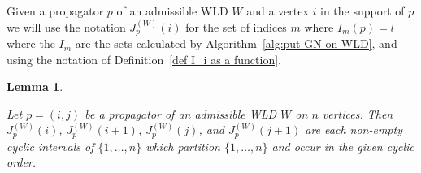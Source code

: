\documentclass[11pt]{article}
\newtheorem{lem}[thm]{Lemma}
\theoremstyle{remark}
\theoremstyle{definition}
\begin{document}
%


Given a propagator $p$ of an admissible WLD $W$ and a vertex $i$ in the support of $p$ we will use the notation $J_p^{(W)}(i)$ for the set of indices $m$ where $I_m(p) = l$ where the $I_m$ are the sets calculated by Algorithm~\ref{alg:put GN on WLD}, and using the notation of Definition~\ref{def I_i as a function}. 

\begin{lem} \label{vertex cyclic int lem}
  
Let $p=(i,j)$ be a propagator of an admissible WLD $W$ on $n$ vertices.  Then $J_p^{(W)}(i)$, $J_p^{(W)}(i+1)$, $J_p^{(W)}(j)$, and $J_p^{(W)}(j+1)$ are each non-empty cyclic intervals of $\{1, \ldots, n\}$ which partition $\{1, \ldots, n\}$ and occur in the given cyclic order.
\end{lem}
\end{document}
